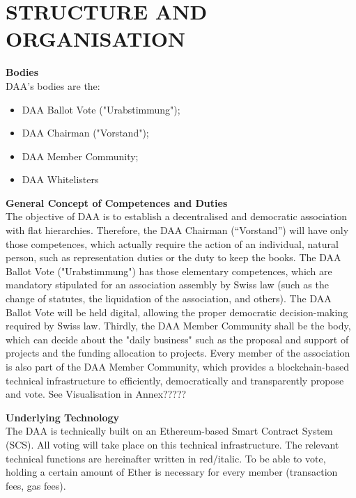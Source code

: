 \section{STRUCTURE AND ORGANISATION}

\item \textbf{Bodies} \\
DAA's bodies are the:
\begin{itemize}
    \item DAA Ballot Vote ("Urabstimmung");
    \item DAA Chairman ("Vorstand");
    \item DAA Member Community;
    \item DAA Whitelisters
\end{itemize}

\item \textbf{General Concept of Competences and Duties} \\
The objective of DAA is to establish a decentralised and democratic association with flat hierarchies.
Therefore, the DAA Chairman (“Vorstand”) will have only those competences, which actually require the action of an individual, natural person, such as representation duties or the duty to keep the books.
The DAA Ballot Vote ("Urabstimmung") has those elementary competences, which are mandatory stipulated for an association assembly by Swiss law (such as the change of statutes, the liquidation of the association, and others).
The DAA Ballot Vote will be held digital, allowing the proper democratic decision-making required by Swiss law.
Thirdly, the DAA Member Community shall be the body, which can decide about the "daily business" such as the proposal and support of projects and the funding allocation to projects.
Every member of the association is also part of the DAA Member Community, which provides a blockchain-based technical infrastructure to efficiently, democratically and transparently propose and vote.
See Visualisation in Annex?????

\item \textbf{Underlying Technology} \\
The DAA is technically built on an Ethereum-based Smart Contract System (SCS).
All voting will take place on this technical infrastructure.
The relevant technical functions are hereinafter written in red/italic.
To be able to vote, holding a certain amount of Ether is necessary for every member (transaction fees, gas fees).

